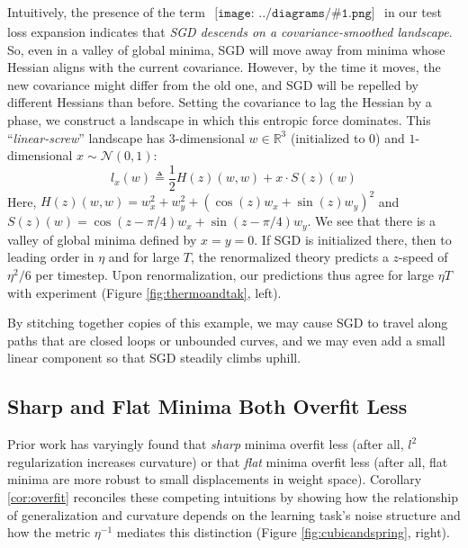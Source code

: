 \documentclass{article}
\theoremstyle{plain}
\theoremstyle{definition}
\newcommand{\Nn}{\mathcal{N}}
\newcommand{\RR}{\mathbb{R}}
\newcommand{\sdia}[1]{\begin{gathered}\texttt{[image: ../diagrams/\#1.png]}\end{gathered}}
\begin{document}
        Intuitively, the presence of the term
        $
            \sdia{c(01-2-3)(02-12-23)}
        $
        in our test loss expansion indicates that 
        \emph{SGD descends on a covariance-smoothed landscape}.
        So, even in a valley of global minima, SGD will move away from minima
        whose Hessian aligns with the current covariance.  However, by the time
        it moves, the new covariance might differ from the old one, and SGD
        will be repelled by different Hessians than before.  Setting the
        covariance to lag the Hessian by a phase, we construct a landscape in
        which this entropic force dominates.  This ``\emph{linear-screw}''
        landscape has
        $3$-dimensional $w\in \RR^3$ (initialized to $0$) and
        $1$-dimensional $x \sim \Nn(0, 1)$:
        $$
            l_x(w)
            \triangleq
            \frac{1}{2} H(z)(w, w) + x \cdot S(z)(w)  
        $$
        Here, $H(z)(w, w) = w_x^2 + w_y^2 + (\cos(z) w_x + \sin(z) w_y)^2$
        and   $S(z)(w)    = \cos(z-\pi/4) w_x + \sin(z-\pi/4) w_y$.
        We see that there is a valley of global minima defined by $x=y=0$. 
        If SGD is initialized there, then to leading order in $\eta$ and for
        large $T$, the renormalized theory predicts a $z$-speed of $\eta^2/6$ 
        per timestep.  Upon renormalization, our predictions thus agree for
        large $\eta T$ with experiment (Figure \ref{fig:thermoandtak}, left).

        By stitching together copies of this example, we may cause SGD to
        travel along paths that are closed loops or unbounded curves, and we
        may even add a small linear component so that SGD steadily climbs
        uphill.  


    \subsection{Sharp and Flat Minima Both Overfit Less} \label{subsect:overfit}
        Prior work has varyingly found that \emph{sharp} minima overfit less
        (after all, $l^2$ regularization increases curvature) or that
        \emph{flat} minima overfit less (after all, flat minima are more
        robust to small displacements in weight space).  Corollary
        \ref{cor:overfit} reconciles these competing intuitions by showing
        how the relationship of generalization and curvature depends on the
        learning task's noise structure and how the metric $\eta^{-1}$ mediates
        this distinction
        (Figure \ref{fig:cubicandspring}, right).
        
\end{document}
